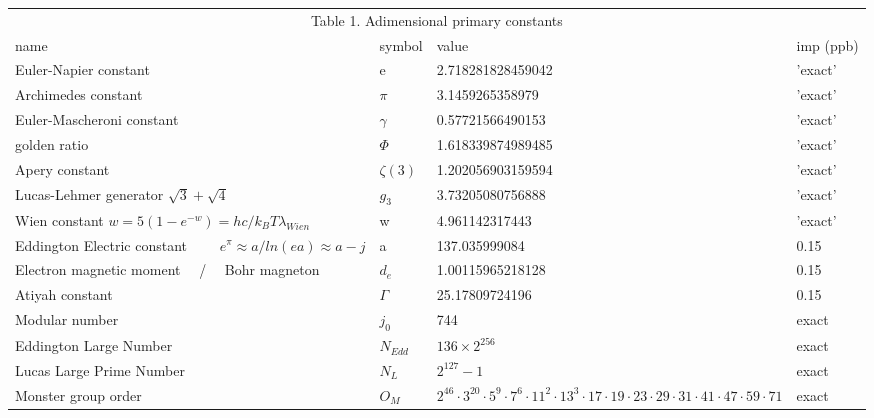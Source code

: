 \documentclass[a4paper,9pt]{article}
\begin{document}
\begin{table}
\label{tab:1}
  \hskip-2.5cm\begin{tabular}{llll}
    \toprule
    \multicolumn{4}{c}{Table 1. Adimensional primary constants}                   \\
    \cmidrule(r){1-4}
    name & symbol    & value & imp (ppb) \\
    \midrule
    
    Euler-Napier constant  & e    & 2.718281828459042 & 'exact' \\
    
    Archimedes constant & $\pi$    & 3.1459265358979 & 'exact' \\ 
    
    Euler-Mascheroni constant & $\gamma$    & 0.57721566490153 & 'exact' \\
    
    golden ratio & $\Phi $    & 1.618339874989485 & 'exact' \\
     
    Apery constant & $\zeta(3)$    & 1.202056903159594 & 'exact' \\
    
    Lucas-Lehmer generator $\sqrt3 + \sqrt4 $  & $g_3$    & 3.73205080756888 & 'exact' \\
    
    Wien constant $w = 5(1-e^{-w})= hc/k_BT\lambda_{Wien}$  & w    & 4.961142317443 & 'exact' \\
    
    Eddington Electric constant ~~~~$e^\pi \approx a/ln(ea)   \approx a-j$  & a    & 137.035999084 & 0.15 \\
    
    Electron magnetic moment ~~/~~ Bohr magneton  & $d_e$    & 1.00115965218128 & 0.15 \\
    
    Atiyah constant & $\Gamma$    & 25.17809724196  & 0.15 \\
    
    Modular number & $j_0$    & 744  & exact \\ 
    
  
     Eddington Large Number & $N_{Edd}$    & $136 \times 2^{256}$  & exact \\
     
     Lucas Large Prime Number & $N_L$    & $2^{127}-1$  & exact \\
     
     Monster group order & $O_M$    & $2^{46}\cdot 3^{20} \cdot 5^9 \cdot 7^6 \cdot 11^2 \cdot 13^3 \cdot 17\cdot 19 \cdot 23 \cdot29 \cdot 31 \cdot 41 \cdot 47 \cdot 59 \cdot 71$  & exact \\
     

\end{tabular}
\end{table}
\end{document}
